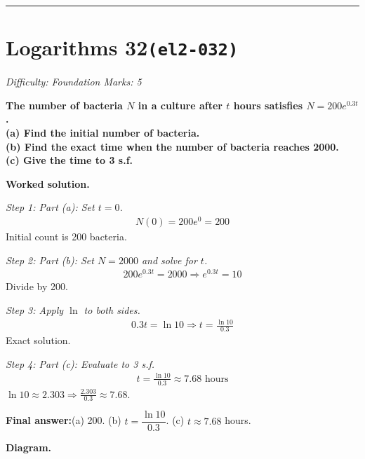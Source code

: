 \documentclass[11pt]{article}
\newcommand{\question}[1]{\par\medskip\noindent\textbf{#1}\par}
\begin{document}
\medskip\hrule

\section*{Logarithms 32\quad\small\texttt{(el2-032)}}
\textit{Difficulty: Foundation \quad\textbar\quad Marks: 5}

\question{The number of bacteria \( N \) in a culture after \( t \) hours satisfies \( N = 200e^{0.3t} \).  \\[3pt]  (a) Find the initial number of bacteria.  \\[3pt]  (b) Find the exact time when the number of bacteria reaches 2000.  \\[3pt]  (c) Give the time to 3 s.f.}

\textbf{Worked solution.}

\textit{Step 1: Part (a): Set \( t = 0 \).}
\[\begin{gathered}
N(0) = 200e^0 = 200
\end{gathered}\]
Initial count is 200 bacteria.

\textit{Step 2: Part (b): Set \( N = 2000 \) and solve for \( t \).}
\[\begin{gathered}
200e^{0.3t} = 2000 \Rightarrow e^{0.3t} = 10
\end{gathered}\]
Divide by 200.

\textit{Step 3: Apply \( \ln \) to both sides.}
\[\begin{gathered}
0.3t = \ln 10 \Rightarrow t = \frac{\ln 10}{0.3}
\end{gathered}\]
Exact solution.

\textit{Step 4: Part (c): Evaluate to 3 s.f.}
\[\begin{gathered}
t = \frac{\ln 10}{0.3} \approx 7.68 \text{ hours}
\end{gathered}\]
\( \ln 10 \approx 2.303 \Rightarrow \frac{2.303}{0.3} \approx 7.68 \).

\begin{answerbox}
\textbf{Final answer:}\quad (a) 200. (b) \(\displaystyle  t = \dfrac{\ln 10}{0.3} \). (c) \(\displaystyle  t \approx 7.68 \) hours.
\end{answerbox}
\textbf{Diagram.}
\end{document}
